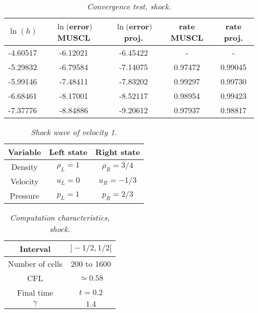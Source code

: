 \documentclass{fldauth}
\theoremstyle{plain}
\theoremstyle{plain}
\theoremstyle{plain}
\theoremstyle{plain}
\theoremstyle{plain}
\theoremstyle{plain}
\begin{document}
\begin{table}[h]
\begin{center}
\begin{tabular}{|c|c|c|c|c|}
\hline $\ln(h)$ & $\ln($error$)$ MUSCL& $\ln($error$)$ proj. & rate MUSCL & rate proj.\\

\hline







-4.60517 &-6.12021 &-6.45422 & -&- \\ \hline

-5.29832 &-6.79584 & -7.14075 & 0.97472&0.99045 \\ \hline

-5.99146 & -7.48411& -7.83202  &  0.99297 &0.99730 \\ \hline

-6.68461 & -8.17001 & -8.52117 & 0.98954&0.99423\\ \hline

-7.37776 &-8.84886 & -9.20612 &  0.97937&0.98817\\ \hline
\end{tabular}
\caption{\label{ratet2}\textit{Convergence test, shock.}}
\end{center}
\end{table}


\begin{table}[h]
\begin{center}
\begin{tabular}{|c|c|c|}
\hline Variable & Left state & Right state \\
\hline  Density & $\rho_L=1$ & $\rho_R=3/4$\\
\hline  Velocity & $u_L=0$ & $u_R=-1/3$\\
\hline Pressure & $p_L=1$ & $p_R=2/3$\\
\hline
\end{tabular}
\caption{\label{discon2}\textit{Shock wave of velocity 1.}}
\end{center}
\end{table}

\begin{table}[h]
\begin{center}
\begin{tabular}{|c|c|}
\hline Interval & $]-1/2,1/2[$  \\
\hline  Number of cells & 200 to 1600 \\
\hline  CFL & $\simeq 0.58$ \\
\hline Final time & $t=0.2$ \\
\hline $\gamma$ & $1.4$ \\
\hline
\end{tabular}
\caption{\label{resum2}\textit{Computation characteristics,
shock.}}
\end{center}
\end{table}
\end{document}
